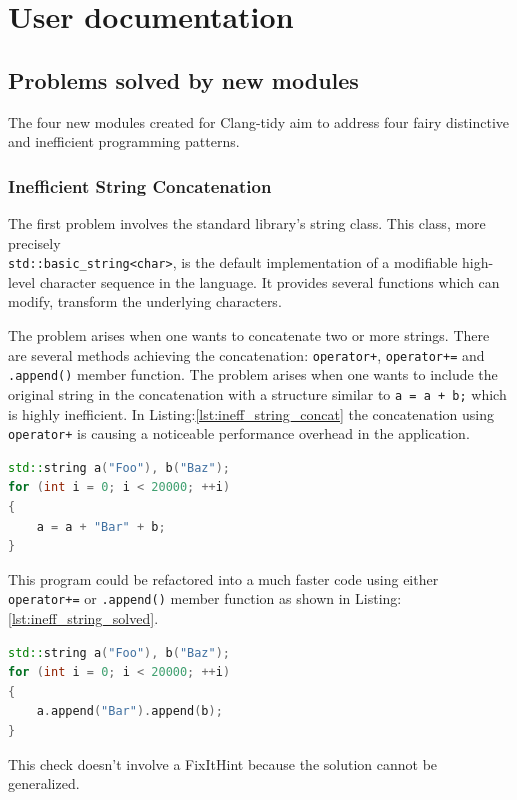 \section{User documentation}
\subsection{Problems solved by new modules}
\par The four new modules created for Clang-tidy aim to address four fairy distinctive and inefficient programming patterns. 
\subsubsection{Inefficient String Concatenation\cite{clang_tidy_string_concat}}
\par The first problem involves the standard library's string class. This class, more precisely \\\verb|std::basic_string<char>|, is the default implementation of a modifiable high-level character sequence in the language. It provides several functions which can modify, transform the underlying characters. \medskip
\par The problem arises when one wants to concatenate two or more strings. There are several methods achieving the concatenation: \verb|operator+|, \verb|operator+=| and \verb|.append()| member function. The problem arises when one wants to include the original string in the concatenation with a structure similar to \verb|a = a + b;| which is highly inefficient. In Listing:\ref{lst:ineff_string_concat} the concatenation using \verb|operator+| is causing a noticeable performance overhead in the application.  \\
\begin{lstlisting}[language=c++, frame=single ,caption={Highly inefficient code}, label={lst:ineff_string_concat}]
std::string a("Foo"), b("Baz");
for (int i = 0; i < 20000; ++i) 
{
	a = a + "Bar" + b;
}
\end{lstlisting}
\par This program could be refactored into a much faster code using either \verb|operator+=| or \verb|.append()| member function as shown in Listing:\ref{lst:ineff_string_solved}.
 \begin{lstlisting}[language=c++, frame=single ,caption={A more efficient version}, label={lst:ineff_string_solved}]
std::string a("Foo"), b("Baz");
for (int i = 0; i < 20000; ++i) 
{
	a.append("Bar").append(b);
}
 \end{lstlisting}
 \par This check doesn't involve a FixItHint because the solution cannot be generalized. 
